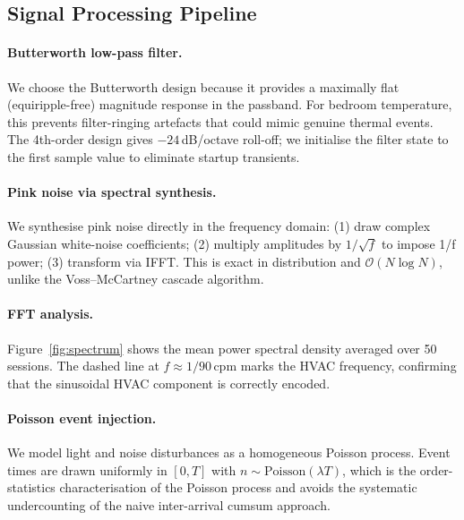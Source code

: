 \documentclass[11pt,a4paper,twocolumn]{article}
\begin{document}
\subsection{Signal Processing Pipeline}

\paragraph{Butterworth low-pass filter.}
We choose the Butterworth design because it provides a maximally flat
(equiripple-free) magnitude response in the passband.
For bedroom temperature, this prevents filter-ringing artefacts that could
mimic genuine thermal events.
The 4th-order design gives $-24$\,dB/octave roll-off; we initialise the
filter state to the first sample value to eliminate startup transients.

\paragraph{Pink noise via spectral synthesis.}
We synthesise pink noise directly in the frequency domain:
(1) draw complex Gaussian white-noise coefficients;
(2) multiply amplitudes by $1/\sqrt{f}$ to impose 1/f power;
(3) transform via IFFT.
This is exact in distribution and $\mathcal{O}(N \log N)$, unlike the
Voss--McCartney cascade algorithm.

\paragraph{FFT analysis.}
Figure~\ref{fig:spectrum} shows the mean power spectral density averaged over
50 sessions.  The dashed line at $f \approx 1/90$\,cpm marks the HVAC frequency,
confirming that the sinusoidal HVAC component is correctly encoded.

\paragraph{Poisson event injection.}
We model light and noise disturbances as a homogeneous Poisson process.
Event times are drawn uniformly in $[0, T]$ with $n \sim \text{Poisson}(\lambda T)$,
which is the order-statistics characterisation of the Poisson process and
avoids the systematic undercounting of the naive inter-arrival cumsum approach.
\end{document}
